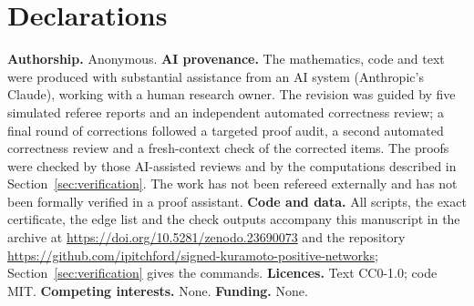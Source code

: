 \documentclass[11pt,a4paper]{article}
\theoremstyle{definition}\newtheorem{conjecture}{Conjecture}
\theoremstyle{remark}\newtheorem{remark}[theorem]{Remark}
\begin{document}
\section*{Declarations}
\textbf{Authorship.} Anonymous. \textbf{AI provenance.} The mathematics, code and text were produced with substantial assistance from an AI system (Anthropic's Claude), working with a human research owner. The revision was guided by five simulated referee reports and an independent automated correctness review; a final round of corrections followed a targeted proof audit, a second automated correctness review and a fresh-context check of the corrected items. The proofs were checked by those AI-assisted reviews and by the computations described in Section~\ref{sec:verification}. The work has not been refereed externally and has not been formally verified in a proof assistant. \textbf{Code and data.} All scripts, the exact certificate, the edge list and the check outputs accompany this manuscript in the archive at \url{https://doi.org/10.5281/zenodo.23690073} and the repository \url{https://github.com/ipitchford/signed-kuramoto-positive-networks}; Section~\ref{sec:verification} gives the commands. \textbf{Licences.} Text CC0-1.0; code MIT. \textbf{Competing interests.} None. \textbf{Funding.} None.
\end{document}
